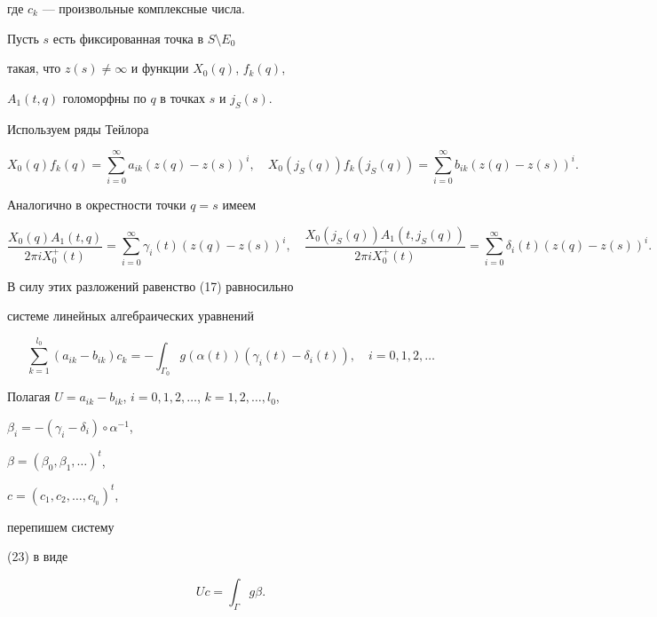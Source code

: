 где $c_k$ --- произвольные комплексные числа.





Пусть $s$ есть фиксированная точка в $S\setminus E_0$


такая, что $z(s)\ne \infty$ и функции $X_0(q)$, $f_k(q)$,


$A_1(t, q)$ голоморфны по $q$ в точках $s$ и $j_S(s)$.


Используем ряды Тейлора


$$


X_0(q)f_k(q)=\sum_{i=0}^\infty a_{ik}(z(q)-z(s))^i,\quad


X_0(j_S(q))f_k(j_S(q))=\sum_{i=0}^\infty b_{ik}(z(q)-z(s))^i.


$$


Аналогично в окрестности точки $q=s$ имеем


$$


\frac{X_0(q)A_1(t, q)}{2\pi iX_0^+(t)}=\sum_{i=0}^\infty


\gamma_i(t)(z(q)-z(s))^i,\quad


\frac{X_0(j_S(q))A_1(t, j_S(q))}{2\pi iX_0^+(t)}=\sum_{i=0}^\infty


\delta_i(t)(z(q)-z(s))^i.


$$





В силу этих разложений равенство (17) равносильно


системе линейных алгебраических уравнений


\begin{equation}


\sum_{k=1}^{l_0}(a_{ik}-b_{ik})c_k=-\int_{\Gamma_0}g(\alpha(t))(\gamma_i(t)-


\delta_i(t)),\quad i=0,1,2,\dotsc


\end{equation}


Полагая $U=a_{ik}-b_{ik}$, $i=0,1,2,\dotsc$, $k=1,2,\dotsc,l_0$,


$\beta_i=-(\gamma_i-\delta_i)\circ \alpha^{-1}$,


$\beta=(\beta_0,\beta_1,\dotsc)^t$,


$c=(c_1,c_2,\dotsc,c_{l_0})^t$,


перепишем систему


(23) в виде


\begin{equation}


Uc=\int_\Gamma g\beta.


\end{equation}





